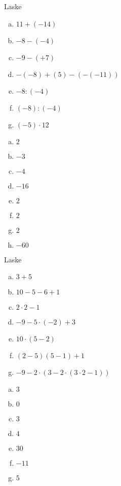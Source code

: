     \begin{tehtava}
    Laske
    \begin{enumerate}[a)]
        \item $11+(-14)$
        \item $-8-(-4)$
        \item $-9-(+7)$
        \item $-(-8)+(5)-(-(-11))$
        \item $-8:(-4)$
        \item $(-8):(-4)$
        \item $(-5)\cdot 12$
    \end{enumerate}
        \begin{vastaus}
        \begin{enumerate}[a)]
            \item $2$
            \item $-3$
            \item $-4$
            \item $-16$
            \item $2$
            \item $2$
            \item $2$
            \item $-60$
        \end{enumerate}
        \end{vastaus}
    \end{tehtava}

    \begin{tehtava}
        Laske
        \begin{enumerate}[a)]
            \item $3+5$
            \item $10-5-6+1$
            \item $2 \cdot 2 - 1$
            \item $-9 - 5 \cdot (-2) + 3$
            \item $10 \cdot (5 - 2)$
            \item $(2-5)(5 - 1) + 1$
            \item $-9 - 2 \cdot ( 3 - 2 \cdot (3\cdot2 - 1))$
        \end{enumerate}

        \begin{vastaus}
            \begin{enumerate}[a)]
                \item $3$
                \item $0$
                \item $3$
                \item $4$
                \item $30$
                \item $-11$
                \item $5$
            \end{enumerate}
        \end{vastaus}
    \end{tehtava}

